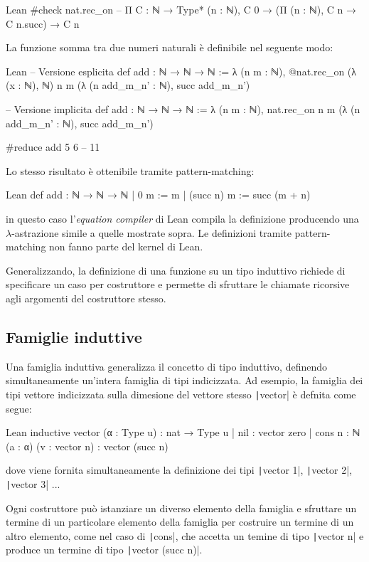 \begin{code}{Lean}
#check nat.rec_on
-- Π {C : ℕ → Type*} (n : ℕ), C 0 → (Π (n : ℕ), C n → C n.succ) → C n
\end{code}
La funzione somma tra due numeri naturali è definibile nel seguente modo:
\begin{code}{Lean}
-- Versione esplicita
def add : ℕ → ℕ → ℕ :=
  λ (n m : ℕ), @nat.rec_on (λ (x : ℕ), ℕ) n m (λ (n add_m_n' : ℕ), succ add_m_n')

-- Versione implicita
def add : ℕ → ℕ → ℕ :=
  λ (n m : ℕ), nat.rec_on n m (λ (n add_m_n' : ℕ), succ add_m_n')

#reduce add 5 6 -- 11
\end{code}
Lo stesso risultato è ottenibile tramite pattern-matching:
\begin{code}{Lean}
def add : ℕ → ℕ → ℕ
| 0        m := m
| (succ n) m := succ (m + n)
\end{code}
in questo caso l'\emph{equation compiler} di Lean compila la definizione producendo una $\lambda$-astrazione simile a quelle mostrate sopra. Le definizioni tramite pattern-matching non fanno parte del kernel di Lean.

Generalizzando, la definizione di una funzione su un tipo induttivo richiede di specificare un caso per costruttore e permette di sfruttare le chiamate ricorsive agli argomenti del costruttore stesso.

\begin{comment}
Ad esempio, il tipo \begin{mintinline}{Lean} and \end{mintinline} è definito come segue:
\begin{code}{Lean}
inductive and {p : Prop} {q : Prop} : Prop
| intro : p → q → and 
\end{code}
\end{comment}

\subsection{Famiglie induttive}
Una famiglia induttiva generalizza il concetto di tipo induttivo, definendo simultaneamente un'intera famiglia di tipi indicizzata. Ad esempio, la famiglia dei tipi vettore indicizzata sulla dimesione del vettore stesso \texttt|vector| è defnita come segue:
\begin{code}{Lean}
inductive vector (α : Type u) : nat → Type u
| nil {}                              : vector zero
| cons {n : ℕ} (a : α) (v : vector n) : vector (succ n)
\end{code}
dove viene fornita simultaneamente la definizione dei tipi \texttt|vector 1|, \texttt|vector 2|, \texttt|vector 3| ...

Ogni costruttore può istanziare un diverso elemento della famiglia e sfruttare un termine di un particolare elemento della famiglia per costruire un termine di un altro elemento, come nel caso di \texttt|cons|, che accetta un temine di tipo \texttt|vector n| e produce un termine di tipo \texttt|vector (succ n)|.